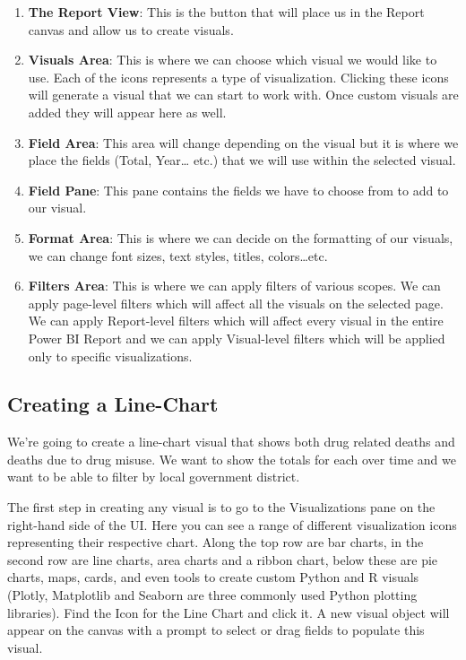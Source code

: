 \documentclass[
]{book}
\begin{document}
\begin{enumerate}
\def\labelenumi{\arabic{enumi}.}
\item
  \textbf{The Report View}: This is the button that will place us in the Report canvas and allow us to create visuals.
\item
  \textbf{Visuals Area}: This is where we can choose which visual we would like to use. Each of the icons represents a type of visualization. Clicking these icons will generate a visual that we can start to work with. Once custom visuals are added they will appear here as well.
\item
  \textbf{Field Area}: This area will change depending on the visual but it is where we place the fields (Total, Year\ldots{} etc.) that we will use within the selected visual.
\item
  \textbf{Field Pane}: This pane contains the fields we have to choose from to add to our visual.
\item
  \textbf{Format Area}: This is where we can decide on the formatting of our visuals, we can change font sizes, text styles, titles, colors\ldots etc.
\item
  \textbf{Filters Area}: This is where we can apply filters of various scopes. We can apply page-level filters which will affect all the visuals on the selected page. We can apply Report-level filters which will affect every visual in the entire Power BI Report and we can apply Visual-level filters which will be applied only to specific visualizations.
\end{enumerate}

\hypertarget{creating-a-line-chart}{%
\subsection{Creating a Line-Chart}\label{creating-a-line-chart}}

We're going to create a line-chart visual that shows both drug related deaths and deaths due to drug misuse. We want to show the totals for each over time and we want to be able to filter by local government district.

The first step in creating any visual is to go to the Visualizations pane on the right-hand side of the UI. Here you can see a range of different visualization icons representing their respective chart. Along the top row are bar charts, in the second row are line charts, area charts and a ribbon chart, below these are pie charts, maps, cards, and even tools to create custom Python and R visuals (Plotly, Matplotlib and Seaborn are three commonly used Python plotting libraries). Find the Icon for the Line Chart and click it. A new visual object will appear on the canvas with a prompt to select or drag fields to populate this visual.
\end{document}
